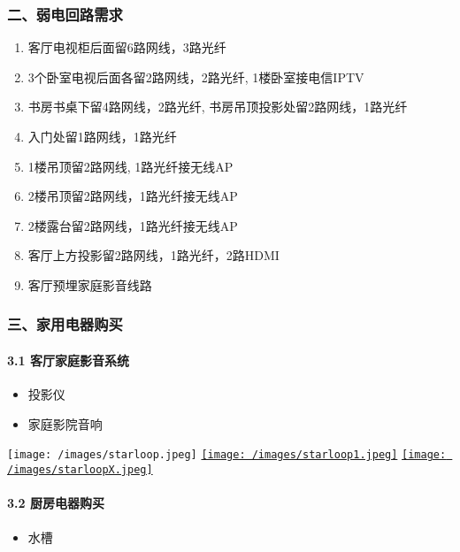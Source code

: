 \documentclass[]{article}
\providecommand{\tightlist}{%
  \setlength{\itemsep}{0pt}\setlength{\parskip}{0pt}}
\let\oldparagraph\paragraph
\renewcommand{\paragraph}[1]{\oldparagraph{#1}\mbox{}}
\begin{document}
\subsubsection{二、弱电回路需求}

\begin{enumerate}
\def\labelenumi{\arabic{enumi}.}
\tightlist
\item
  客厅电视柜后面留6路网线，3路光纤
\item
  3个卧室电视后面各留2路网线，2路光纤, 1楼卧室接电信IPTV
\item
  书房书桌下留4路网线，2路光纤, 书房吊顶投影处留2路网线，1路光纤
\item
  入门处留1路网线，1路光纤
\item
  1楼吊顶留2路网线, 1路光纤接无线AP
\item
  2楼吊顶留2路网线，1路光纤接无线AP
\item
  2楼露台留2路网线，1路光纤接无线AP
\item
  客厅上方投影留2路网线，1路光纤，2路HDMI
\item
  客厅预埋家庭影音线路
\end{enumerate}

\subsubsection{三、家用电器购买}

\paragraph{3.1 客厅家庭影音系统}

\begin{itemize}
\tightlist
\item
  投影仪
\item
  家庭影院音响
\end{itemize}

\texttt{[image: /images/starloop.jpeg]}
\href{https://item.jd.com/46240689641.html\#crumb-wrap}{\texttt{[image: /images/starloop1.jpeg]}}
\href{https://item.jd.com/40250560734.html}{\texttt{[image: /images/starloopX.jpeg]}}

\paragraph{3.2 厨房电器购买}

\begin{itemize}
\tightlist
\item
  水槽
\end{itemize}
\end{document}
